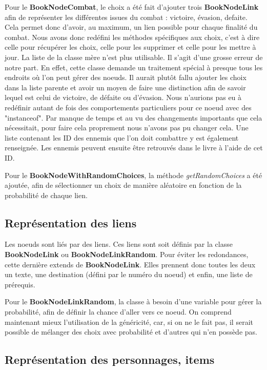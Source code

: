 			Pour le \textbf{BookNodeCombat}, le choix a été fait d'ajouter trois \textbf{BookNodeLink} afin de représenter les différentes issues du combat : victoire, évasion, defaite. Cela permet donc d'avoir, au maximum, un lien possible pour chaque finalité du combat. Nous avons donc redéfini les méthodes spécifiques aux choix, c'est à dire celle pour récupérer les choix, celle pour les supprimer et celle pour les mettre à jour. La liste de la classe mère n'est plus utilisable. Il s'agit d'une grosse erreur de notre part. En effet, cette classe demande un traitement spécial à presque tous les endroits où l'on peut gérer des noeuds. Il aurait plutôt fallu ajouter les choix dans la liste parente et avoir un moyen de faire une distinction afin de savoir lequel est celui de victoire, de défaite ou d'évasion. Nous n'aurions pas eu à redéfinir autant de fois des comportements particuliers pour ce noeud avec des "instanceof". Par manque de temps et au vu des changements importants que cela nécessitait, pour faire cela proprement nous n'avons pas pu changer cela. Une liste contenant les ID des ennemis que l'on doit combattre y est également renseignée. Les ennemis peuvent ensuite être retrouvés dans le livre à l'aide de cet ID.

			Pour le \textbf{BookNodeWithRandomChoices}, la méthode \textit{getRandomChoices} a été ajoutée, afin de sélectionner un choix de manière aléatoire en fonction de la probabilité de chaque lien.

		\subsection{Représentation des liens}
			\label{sub:liens}

			Les noeuds sont liés par des liens. Ces liens sont soit définis par la classe \textbf{BookNodeLink} ou \textbf{BookNodeLinkRandom}. Pour éviter les redondances, cette dernière extends de \textbf{BookNodeLink}. Elles prennent donc toutes les deux un texte, une destination (défini par le numéro du noeud) et enfin, une liste de prérequis.

			Pour le \textbf{BookNodeLinkRandom}, la classe à besoin d'une variable pour gérer la probabilité, afin de définir la chance d'aller vers ce noeud. On comprend maintenant mieux l'utilisation de la généricité, car, si on ne le fait pas, il serait possible de mélanger des choix avec probabilité et d'autres qui n'en possède pas.

		\subsection{Représentation des personnages, items}

